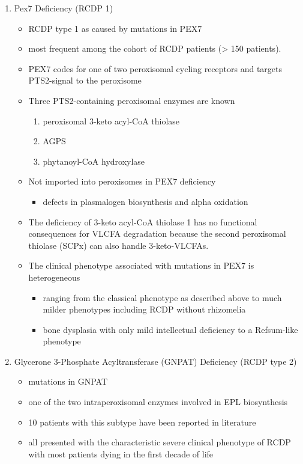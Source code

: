 \documentclass{scrartcl}
\begin{document}
\begin{enumerate}
\item Pex7 Deficiency (RCDP 1)
\label{sec:org949ee5d}

\begin{itemize}
\item RCDP type 1 as caused by mutations in PEX7
\item most frequent among the cohort of RCDP patients (> 150 patients).
\item PEX7 codes for one of two peroxisomal cycling receptors and targets PTS2-signal to the peroxisome
\item Three PTS2-containing peroxisomal enzymes are known 
\begin{enumerate}
\item peroxisomal 3-keto acyl-CoA thiolase
\item AGPS
\item phytanoyl-CoA hydroxylase
\end{enumerate}
\item Not imported into peroxisomes in PEX7 deficiency
\begin{itemize}
\item defects in plasmalogen biosynthesis and alpha oxidation
\end{itemize}
\item The deficiency of 3-keto acyl-CoA thiolase 1 has no functional
consequences for VLCFA degradation because the second peroxisomal
thiolase (SCPx) can also handle 3-keto-VLCFAs.

\item The clinical phenotype associated with mutations in PEX7 is heterogeneous
\begin{itemize}
\item ranging from the classical phenotype as described above to much milder phenotypes including RCDP without rhizomelia
\item bone dysplasia with only mild intellectual deficiency to a Refsum-like phenotype
\end{itemize}
\end{itemize}

\item Glycerone 3-Phosphate Acyltransferase (GNPAT) Deficiency (RCDP type 2)
\label{sec:orgd624c3a}
\begin{itemize}
\item mutations in GNPAT
\item one of the two intraperoxisomal enzymes involved in EPL biosynthesis
\item 10 patients with this subtype have been reported in literature
\item all presented with the characteristic severe clinical phenotype of
RCDP with most patients dying in the first decade of life
\end{itemize}


\end{enumerate}
\end{document}
